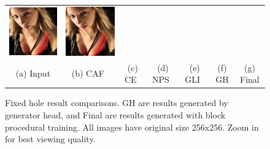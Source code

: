 \begin{figure}[!ht]
\begin{tabular}{ccccccc}
\includegraphics[width=.14\textwidth]{figures/imagenet/imagenet_0197_g.jpg}&
\includegraphics[width=.14\textwidth]{figures/imagenet/imagenet_0197_synthesized_image.jpg}\\
(a) Input & (b) CAF~\cite{barnes2009patchmatch} & (c) CE~\cite{pathak2016context} & (d) NPS~\cite{yang2017high} & (e) GLI~\cite{iizuka2017globally} & (f) GH & (g) Final \\
\end{tabular}
\caption{Fixed hole result comparisons. GH are results generated by generator head, and Final are results generated with block procedural training. All images have original size 256x256. Zoom in for best viewing quality.}
\label{fig:fixed}
\end{figure}

